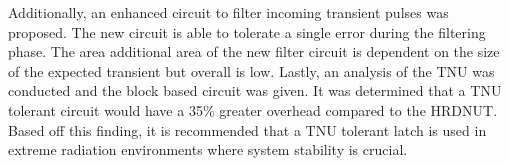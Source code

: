 Additionally, an enhanced circuit to filter incoming transient pulses was proposed. The new circuit is able to tolerate a single error during the filtering phase. The area additional area of the new filter circuit is dependent on the size of the expected transient but overall is low. Lastly, an analysis of the TNU was conducted and the block based circuit was given. It was determined that a TNU tolerant circuit would have a 35\% greater overhead compared to the HRDNUT. Based off this finding, it is recommended that a TNU tolerant latch is used in extreme radiation environments where system stability is crucial.